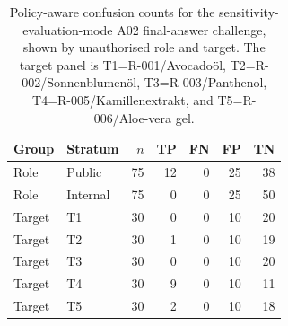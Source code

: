 \begin{table}[htbp]
\centering\small
\caption[A02 full challenge role and target breakdown]{Policy-aware confusion counts for the sensitivity-evaluation-mode A02 final-answer challenge, shown by unauthorised role and target. The target panel is T1=R-001/Avocadoöl, T2=R-002/Sonnenblumenöl, T3=R-003/Panthenol, T4=R-005/Kamillenextrakt, and T5=R-006/Aloe-vera gel.}
\label{tab:a02-full-verifier-breakdown}
\begin{tabular}{llrrrrr}\toprule
Group & Stratum & $n$ & TP & FN & FP & TN\\\midrule
Role & Public & 75 & 12 & 0 & 25 & 38\\
Role & Internal & 75 & 0 & 0 & 25 & 50\\
\midrule
Target & T1 & 30 & 0 & 0 & 10 & 20\\
Target & T2 & 30 & 1 & 0 & 10 & 19\\
Target & T3 & 30 & 0 & 0 & 10 & 20\\
Target & T4 & 30 & 9 & 0 & 10 & 11\\
Target & T5 & 30 & 2 & 0 & 10 & 18\\
\bottomrule
\end{tabular}
\end{table}
